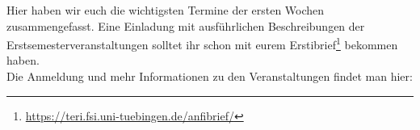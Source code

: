 
Hier haben wir euch die wichtigsten Termine der ersten Wochen
zusammengefasst. Eine Einladung mit ausführlichen Beschreibungen der
Erstsemesterveranstaltungen solltet ihr schon mit eurem
Erstibrief\footnote{\url{https://teri.fsi.uni-tuebingen.de/anfibrief/}}
bekommen haben.\\
Die Anmeldung und mehr Informationen zu den Veranstaltungen findet man hier:\\

\newcommand{\event}{\cellcolor{lightlightgray}}



